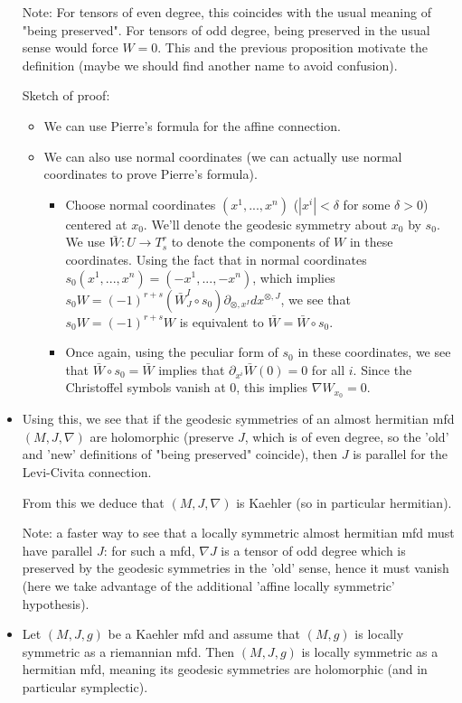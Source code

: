 \documentclass{report}
\theoremstyle{definition}
\begin{document}
\begin{itemize}
    Note: For tensors of even degree, this coincides with the usual meaning of "being preserved". For tensors of odd degree, being preserved in the usual sense would force $W=0$. This and the previous proposition motivate the definition (maybe we should find another name to avoid confusion).

    Sketch of proof:
    \begin{itemize}
        \item We can use Pierre's formula for the affine connection.
        \item We can also use normal coordinates (we can actually use normal coordinates to prove Pierre's formula). 

        \begin{itemize}
            \item Choose normal coordinates $(x^1,...,x^n)$ ($|x^i|<\delta$ for some $\delta>0$) centered at $x_0$. We'll denote the geodesic symmetry about $x_0$ by $s_0$.  We use $\bar{W}:U\to T^r_s$ to denote the components of $W$ in these coordinates. Using the fact that in normal coordinates $s_0(x^1,...,x^n)=(-x^1,...,-x^n)$, which implies $s_0 W=(-1)^{r+s}(\bar{W}^I_J\circ{s_0})\partial_{\otimes,x^I}dx^{\otimes,J}$, we see that $s_0 W=(-1)^{r+s}W$ is equivalent to $\bar{W}=\bar{W}\circ s_0$.
            \item Once again, using the peculiar form of $s_0$ in these coordinates, we see that $\bar{W}\circ s_0=\bar{W}$ implies that $\partial_{x^i}\bar{W}(0)=0$ for all $i$. Since the Christoffel symbols vanish at $0$, this implies $\nabla W_{x_0}=0$.
        \end{itemize}
    \end{itemize}
    \item Using this, we see that if the geodesic symmetries of an almost hermitian mfd $(M,J,\nabla)$ are holomorphic (preserve $J$, which is of even degree, so the 'old' and 'new' definitions of "being preserved" coincide), then $J$ is parallel for the Levi-Civita connection.

    From this we deduce that $(M,J,\nabla)$ is Kaehler (so in particular hermitian).

    Note: a faster way to see that a locally symmetric almost hermitian mfd must have parallel $J$: for such a mfd, $\nabla J$ is a tensor of odd degree which is preserved by the geodesic symmetries in the 'old' sense, hence it must vanish (here we take advantage of the additional 'affine locally symmetric' hypothesis).
    \item Let $(M,J,g)$ be a Kaehler mfd and assume that $(M,g)$ is locally symmetric as a riemannian mfd. Then $(M,J,g)$ is locally symmetric as a hermitian mfd, meaning its geodesic symmetries are holomorphic (and in particular symplectic).


\end{itemize}
\end{document}
